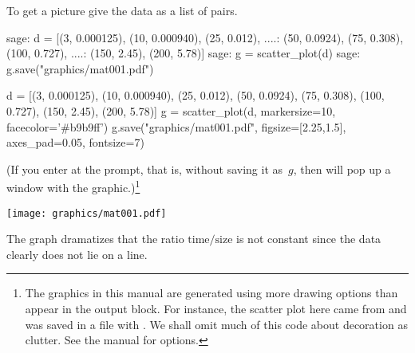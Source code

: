 To get a picture give \Sage{} the data as a list of pairs.
\begin{sagecommandline}
sage: d = [(3, 0.000125), (10, 0.000940), (25, 0.012),  
....:      (50, 0.0924), (75, 0.308), (100, 0.727), 
....:      (150, 2.45), (200, 5.78)]
sage: g = scatter_plot(d)  
sage: g.save("graphics/mat001.pdf")            
\end{sagecommandline}
\begin{sagesilent}
d = [(3, 0.000125), (10, 0.000940), (25, 0.012),  
     (50, 0.0924), (75, 0.308), (100, 0.727), 
     (150, 2.45), (200, 5.78)]
g = scatter_plot(d, markersize=10, facecolor='#b9b9ff')
g.save("graphics/mat001.pdf", figsize=[2.25,1.5], axes_pad=0.05, fontsize=7)
\end{sagesilent}
\noindent
(If you enter  at the prompt, that is, 
without saving it as~$g$, then \Sage{} will pop up a window with the
graphic.)\footnote{The graphics in this manual are generated using 
more drawing options than appear in the output block.
For instance, the scatter plot here came from
\protect{}
and was saved in a file with
\protect{}.
We shall omit much of this code about decoration as clutter.
See the \protect\Sage{} manual for \protect{} options.}
\begin{center}
  \texttt{[image: graphics/mat001.pdf]}
\end{center}
The graph dramatizes that the ratio $\text{time}/\text{size}$
is not constant
since the data clearly does not lie on a line.

